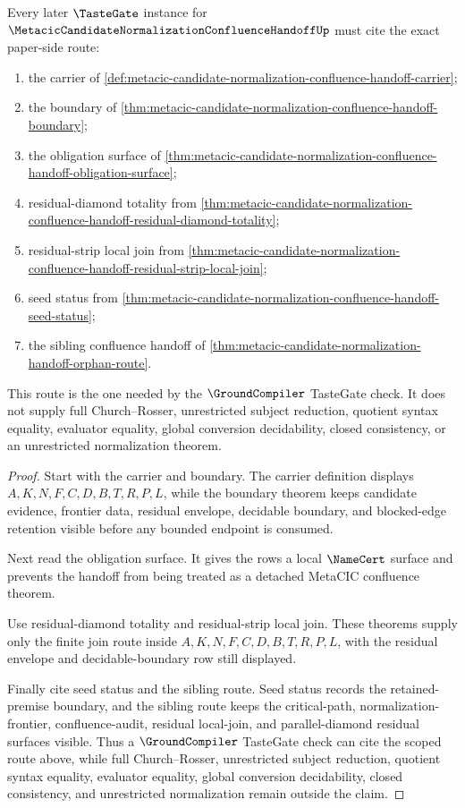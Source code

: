 \begin{theorem}
\label{thm:metacic-candidate-handoff-scoped-tastegate-route}
Every later $\TasteGate$ instance for
$\MetacicCandidateNormalizationConfluenceHandoffUp$ must cite the exact
paper-side route:
\begin{enumerate}
\item the carrier of \autoref{def:metacic-candidate-normalization-confluence-handoff-carrier};
\item the boundary of \autoref{thm:metacic-candidate-normalization-confluence-handoff-boundary};
\item the obligation surface of \autoref{thm:metacic-candidate-normalization-confluence-handoff-obligation-surface};
\item residual-diamond totality from \autoref{thm:metacic-candidate-normalization-confluence-handoff-residual-diamond-totality};
\item residual-strip local join from \autoref{thm:metacic-candidate-normalization-confluence-handoff-residual-strip-local-join};
\item seed status from \autoref{thm:metacic-candidate-normalization-confluence-handoff-seed-status};
\item the sibling confluence handoff of \autoref{thm:metacic-candidate-normalization-handoff-orphan-route}.
\end{enumerate}
This route is the one needed by the $\GroundCompiler$ TasteGate check. It does
not supply full Church--Rosser, unrestricted subject reduction, quotient syntax
equality, evaluator equality, global conversion decidability, closed
consistency, or an unrestricted normalization theorem.
\end{theorem}
\begin{proof}
Start with the carrier and boundary. The carrier definition displays
$A,K,N,F,C,D,B,T,R,P,L$, while the boundary theorem keeps candidate evidence,
frontier data, residual envelope, decidable boundary, and blocked-edge
retention visible before any bounded endpoint is consumed.

Next read the obligation surface. It gives the rows a local
$\NameCert$ surface and prevents the handoff from being treated as a detached
MetaCIC confluence theorem.

Use residual-diamond totality and residual-strip local join. These theorems
supply only the finite join route inside $A,K,N,F,C,D,B,T,R,P,L$, with the
residual envelope and decidable-boundary row still displayed.

Finally cite seed status and the sibling route. Seed status records the
retained-premise boundary, and the sibling route keeps the critical-path,
normalization-frontier, confluence-audit, residual local-join, and
parallel-diamond residual surfaces visible. Thus a $\GroundCompiler$
TasteGate check can cite the scoped route above, while full Church--Rosser,
unrestricted subject reduction, quotient syntax equality, evaluator equality,
global conversion decidability, closed consistency, and unrestricted
normalization remain outside the claim.
\end{proof}

